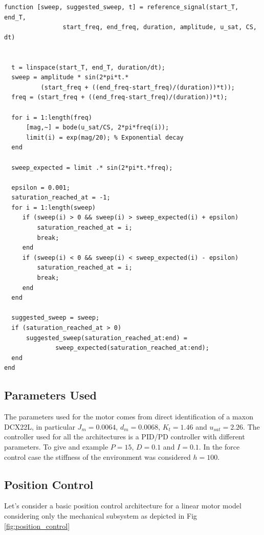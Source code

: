 \documentclass[a4paper,11pt]{article}
\begin{document}
\begin{lstlisting}[basicstyle=\small]
function [sweep, suggested_sweep, t] = reference_signal(start_T, end_T, 
                start_freq, end_freq, duration, amplitude, u_sat, CS, dt)


  t = linspace(start_T, end_T, duration/dt);
  sweep = amplitude * sin(2*pi*t.*
          (start_freq + ((end_freq-start_freq)/(duration))*t));
  freq = (start_freq + ((end_freq-start_freq)/(duration))*t);

  for i = 1:length(freq) 
      [mag,~] = bode(u_sat/CS, 2*pi*freq(i));
      limit(i) = exp(mag/20); % Exponential decay
  end

  sweep_expected = limit .* sin(2*pi*t.*freq);

  epsilon = 0.001;
  saturation_reached_at = -1;
  for i = 1:length(sweep)
     if (sweep(i) > 0 && sweep(i) > sweep_expected(i) + epsilon)
         saturation_reached_at = i;
         break;
     end
     if (sweep(i) < 0 && sweep(i) < sweep_expected(i) - epsilon)
         saturation_reached_at = i;
         break;
     end
  end
  
  suggested_sweep = sweep;
  if (saturation_reached_at > 0)
      suggested_sweep(saturation_reached_at:end) = 
              sweep_expected(saturation_reached_at:end);
  end
end
\end{lstlisting}

\newpage

\subsection{Parameters Used}

\bigskip
The parameters used for the motor comes from direct identification of a maxon DCX22L, in particular $J_m = 0.0064$, $d_m = 0.0068$, $K_t = 1.46$ and $u_{sat} = 2.26$. The controller used for all the architectures is a PID/PD controller with different parameters. To give and example $P = 15$, $D = 0.1$ and $I = 0.1$. In the force control case the stiffness of the environment was considered $h = 100$.

\bigskip
\subsection{Position Control}
Let's consider a basic position control architecture for a linear motor model considering only the mechanical subsystem as depicted in Fig \ref{fig:position_control}
\end{document}
